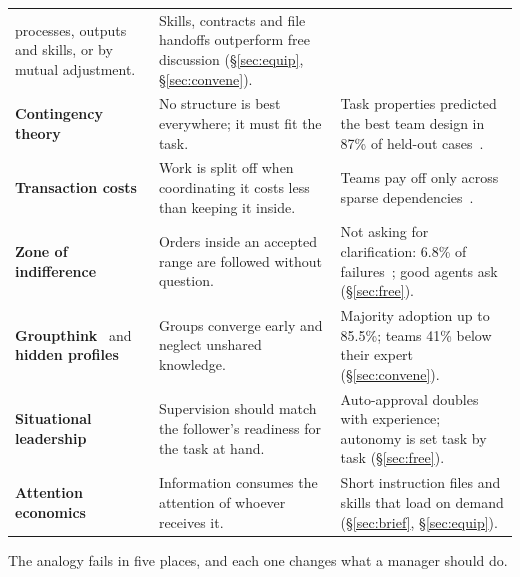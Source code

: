 \documentclass[11pt,letterpaper]{article}
\begin{document}
{\begin{longtable}{@{}R{3.5cm}@{\hspace{1.1em}}R{5.7cm}@{\hspace{1.1em}}R{5.8cm}@{}}
  processes, outputs and skills, or by mutual adjustment. & Skills, contracts and file
  handoffs outperform free discussion (\S\ref{sec:equip}, \S\ref{sec:convene}). \\ \addlinespace[0.32em]
\textbf{Contingency theory}~\cite{lawrence} & No structure is best everywhere; it must fit
  the task. & Task properties predicted the best team design in 87\% of held-out
  cases~\cite{kim}. \\ \addlinespace[0.32em]
\textbf{Transaction costs}~\cite{coase} & Work is split off when coordinating it costs less
  than keeping it inside. & Teams pay off only across sparse dependencies~\cite{yuan}. \\ \addlinespace[0.32em]
\textbf{Zone of indifference}~\cite{barnard} & Orders inside an accepted range are followed
  without question. & Not asking for clarification: 6.8\% of failures~\cite{mast}; good agents ask
  (\S\ref{sec:free}). \\ \addlinespace[0.32em]
\textbf{Groupthink}~\cite{janis} and \textbf{hidden profiles}~\cite{stasser} & Groups
  converge early and neglect unshared knowledge. & Majority adoption up to 85.5\%; teams
  41\% below their expert (\S\ref{sec:convene}). \\ \addlinespace[0.32em]
\textbf{Situational leadership}~\cite{hersey} & Supervision should match the follower's
  readiness for the task at hand. & Auto-approval doubles with experience; autonomy is set
  task by task (\S\ref{sec:free}). \\ \addlinespace[0.32em]
\textbf{Attention economics}~\cite{simon} & Information consumes the attention of whoever
  receives it. & Short instruction files and skills that load on demand (\S\ref{sec:brief},
  \S\ref{sec:equip}). \\
\end{longtable}}

The analogy fails in five places, and each one changes what a manager should do.
\end{document}
